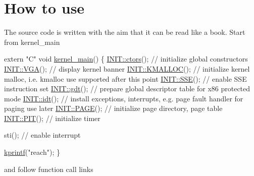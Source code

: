 \hypertarget{index_intro_sec}{}\section{How to use}\label{index_intro_sec}
The source code is written with the aim that it can be read like a book. Start from kernel\+\_\+main 
\begin{DoxyCodeInclude}

\textcolor{keyword}{extern} \textcolor{stringliteral}{"C"} \textcolor{keywordtype}{void} \hyperlink{kernel_8cpp_ada8402e0c504af8cafef5cc76c076003}{kernel\_main}()
\{
    \hyperlink{namespace_i_n_i_t_a6608557e41ad37cdb4a408e2f05c9783}{INIT::ctors}();   \textcolor{comment}{// initialize global constructors}
    \hyperlink{namespace_i_n_i_t_abae5789d80f8edd37455f3b167779654}{INIT::VGA}();     \textcolor{comment}{// display kernel banner}
    \hyperlink{namespace_i_n_i_t_ac811302ce0948a6a097b445b811f9c14}{INIT::KMALLOC}(); \textcolor{comment}{// initialize kernel malloc, i.e. kmalloc use supported after this point}
    \hyperlink{namespace_i_n_i_t_a8928ddbb4ca671dfe1c740da380fa0c4}{INIT::SSE}();     \textcolor{comment}{// enable SSE instruction set}
    \hyperlink{namespace_i_n_i_t_a3462d7bc51bce77cc240d05b62b1b777}{INIT::gdt}();     \textcolor{comment}{// prepare global descriptor table for x86 protected mode}
    \hyperlink{namespace_i_n_i_t_aec8e9f01cb09653075b6e610096b3ca9}{INIT::idt}();     \textcolor{comment}{// install exceptions, interrupts, e.g. page fault handler for paging use
       later}
    \hyperlink{namespace_i_n_i_t_aea383d3de30095cf9d176fa60b66d01d}{INIT::PAGE}();    \textcolor{comment}{// initialize page directory, page table}
    \hyperlink{namespace_i_n_i_t_a6fa46ed9b50062458ede3692a4865c51}{INIT::PIT}();     \textcolor{comment}{// initialize timer}

    sti();           \textcolor{comment}{// enable interrupt}

    \hyperlink{kprintf_8h_ae610f6b2bc90ea3eed7852d591c48116}{kprintf}(\textcolor{stringliteral}{"reach"});
\}
\end{DoxyCodeInclude}
and follow function call links 